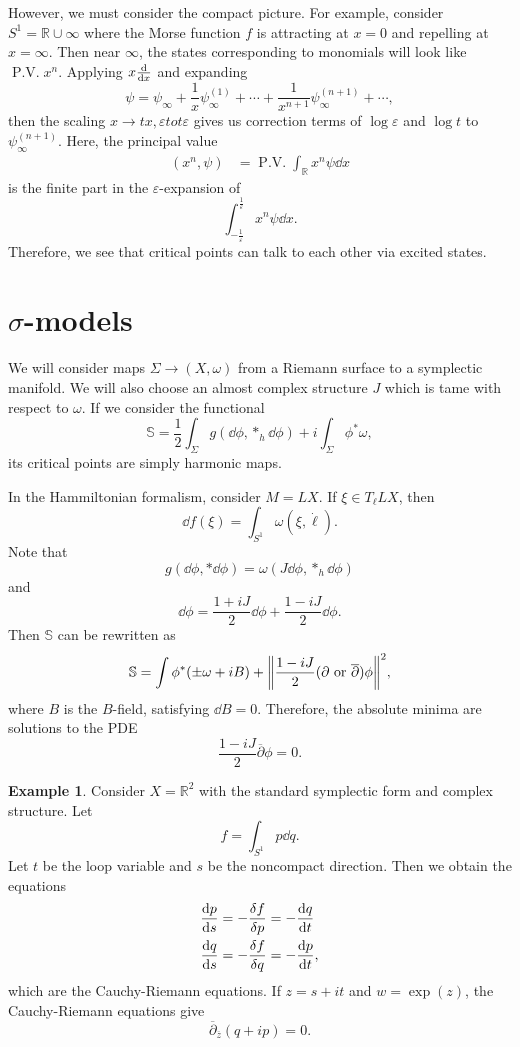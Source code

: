 \documentclass[leqno, openany]{memoir}
\theoremstyle{definition}
\newtheorem{exm}[thm]{Example}
\theoremstyle{remark}
\theoremstyle{plain}
\theoremstyle{definition}
\theoremstyle{remark}
\newcommand{\R}{\mathbb{R}}
\newcommand{\ep}{\varepsilon}
\newcommand{\on}[1]{\operatorname{#1}}
\newcommand{\ol}[1]{\overline{#1}}
\begin{document}
However, we must consider the compact picture. For example, consider $S^1 = \R \cup \infty$ where the Morse function $f$ is attracting at $x=0$ and repelling at $x=\infty$. Then near $\infty$, the states  corresponding to monomials will look like $\on{P.V.}x^n$. Applying $x \dv{x}$ and expanding
\[ \psi = \psi_{\infty} + \frac{1}{x}\psi_{\infty}^{(1)} + \cdots + \frac{1}{x^{n+1}} \psi_{\infty}^{(n+1)} + \cdots, \]
then the scaling $x \to tx, \ep to t\ep$ gives us correction terms of $\log \ep$ and $\log t$ to $\psi_{\infty}^{(n+1)}$. Here, the principal value
\begin{align*}
    (x^n,\psi) &= \on{P.V.} \int_{\R} x^n \psi \dd{x}
\end{align*}
is the finite part in the $\ep$-expansion of
\[ \int_{-\frac{1}{\ep}}^{\frac{1}{\ep}} x^n \psi \dd{x}. \]
Therefore, we see that critical points can talk to each other via excited states.

\section{$\sigma$-models}

We will consider maps $\Sigma \to (X,\omega)$ from a Riemann surface to a symplectic manifold. We will also choose an almost complex structure $J$ which is tame with respect to $\omega$. If we consider the functional
\[ \mathbb{S} = \frac{1}{2} \int_{\Sigma} g(\dd{\phi}, *_h \dd{\phi}) + i \int_{\Sigma} \phi^* \omega, \]
its critical points are simply harmonic maps.

In the Hammiltonian formalism, consider $M = LX$. If $\xi \in T_{\ell} LX$, then
\[ \dd{f}(\xi) = \int_{S^1} \omega(\xi, \dot{\ell}). \]
Note that
\[ g(\dd{\phi}, * \dd{\phi}) = \omega(J \dd{\phi}, *_h \dd{\phi}) \]
and
\[ \dd{\phi} = \frac{1+iJ}{2} \dd{\phi} + \frac{1-iJ}{2} \dd{\phi}. \]
Then $\mathbb{S}$ can be rewritten as
\[ \mathbb{S} = \int \phi^*(\pm \omega + iB) + \norm{\frac{1-iJ}{2} (\partial \text{ or }\ol{\partial})\phi}^2, \]
where $B$ is the $B$-field, satisfying $\dd{B} = 0$. Therefore, the absolute minima are solutions to the PDE
\[ \frac{1-iJ}{2} \ol{\partial}\phi = 0. \]

\begin{exm}
    Consider $X = \R^2$ with the standard symplectic form and complex structure. Let
    \[ f = \int_{S^1} p \dd{q}. \]
    Let $t$ be the loop variable and $s$ be the noncompact direction. Then we obtain the equations
    \begin{align*}
        \dv{p}{s} &= -\fdv{f}{p} = -\dv{q}{t} \\
        \dv{q}{s} &= -\fdv{f}{q} = -\dv{p}{t},
    \end{align*}
    which are the Cauchy-Riemann equations. If $z = s + it$ and $w = \exp(z)$, the Cauchy-Riemann equations give
    \[ \ol{\partial}_{\ol{z}} (q+ip) = 0. \]
\end{exm}
\end{document}
